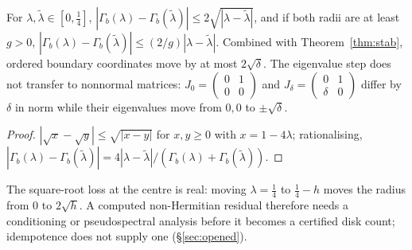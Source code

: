 \begin{proposition}\label{prop:holder}
For $\lambda,\tilde\lambda\in[0,\tfrac14]$, $|\Gamma_b(\lambda)-\Gamma_b(\tilde\lambda)|\le2\sqrt{|\lambda-\tilde\lambda|}$, and if both radii are at least $g>0$, $|\Gamma_b(\lambda)-\Gamma_b(\tilde\lambda)|\le(2/g)|\lambda-\tilde\lambda|$. Combined with Theorem~\ref{thm:stab}, ordered boundary coordinates move by at most $2\sqrt\delta$. The eigenvalue step does not transfer to nonnormal matrices: $J_0=\begin{pmatrix}0&1\\0&0\end{pmatrix}$ and $J_\delta=\begin{pmatrix}0&1\\\delta&0\end{pmatrix}$ differ by $\delta$ in norm while their eigenvalues move from $0,0$ to $\pm\sqrt\delta$. 
\end{proposition}
\begin{proof}
$|\sqrt x-\sqrt y|\le\sqrt{|x-y|}$ for $x,y\ge0$ with $x=1-4\lambda$; rationalising, $|\Gamma_b(\lambda)-\Gamma_b(\tilde\lambda)|=4|\lambda-\tilde\lambda|/(\Gamma_b(\lambda)+\Gamma_b(\tilde\lambda))$.
\end{proof}
The square-root loss at the centre is real: moving $\lambda=\tfrac14$ to $\tfrac14-h$ moves the radius from $0$ to $2\sqrt h$. A computed non-Hermitian residual therefore needs a conditioning or pseudospectral analysis before it becomes a certified disk count; idempotence does not supply one (§\ref{sec:opened}).

